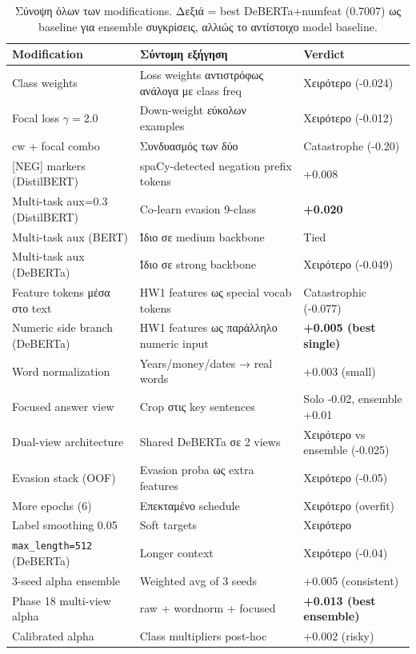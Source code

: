 \documentclass[12pt]{fphw}
\begin{document}
\begin{table}[H]
\centering
\small
\begin{tabularx}{\textwidth}{lXl}
\toprule
Modification & Σύντομη εξήγηση & Verdict \\
\midrule
Class weights & Loss weights αντιστρόφως ανάλογα με class freq & Χειρότερο (-0.024) \\
Focal loss $\gamma=2.0$ & Down-weight εύκολων examples & Χειρότερο (-0.012) \\
cw + focal combo & Συνδυασμός των δύο & Catastrophe (-0.20) \\
{[NEG]} markers (DistilBERT) & spaCy-detected negation prefix tokens & +0.008 \\
Multi-task aux=0.3 (DistilBERT) & Co-learn evasion 9-class & \textbf{+0.020} \\
Multi-task aux (BERT) & Ίδιο σε medium backbone & Tied \\
Multi-task aux (DeBERTa) & Ίδιο σε strong backbone & Χειρότερο (-0.049) \\
Feature tokens μέσα στο text & HW1 features ως special vocab tokens & Catastrophic (-0.077) \\
Numeric side branch (DeBERTa) & HW1 features ως παράλληλο numeric input & \textbf{+0.005 (best single)} \\
Word normalization & Years/money/dates → real words & +0.003 (small) \\
Focused answer view & Crop στις key sentences & Solo -0.02, ensemble +0.01 \\
Dual-view architecture & Shared DeBERTa σε 2 views & Χειρότερο vs ensemble (-0.025) \\
Evasion stack (OOF) & Evasion proba ως extra features & Χειρότερο (-0.05) \\
More epochs (6) & Επεκταμένο schedule & Χειρότερο (overfit) \\
Label smoothing 0.05 & Soft targets & Χειρότερο \\
\texttt{max\_length=512} (DeBERTa) & Longer context & Χειρότερο (-0.04) \\
3-seed alpha ensemble & Weighted avg of 3 seeds & +0.005 (consistent) \\
Phase 18 multi-view alpha & raw + wordnorm + focused & \textbf{+0.013 (best ensemble)} \\
Calibrated alpha & Class multipliers post-hoc & +0.002 (risky) \\
\bottomrule
\end{tabularx}
\caption{Σύνοψη όλων των modifications. Δεξιά = best DeBERTa+numfeat (0.7007) ως baseline για ensemble συγκρίσεις, αλλιώς το αντίστοιχο model baseline.}
\label{tab:mods}
\end{table}
\end{document}
